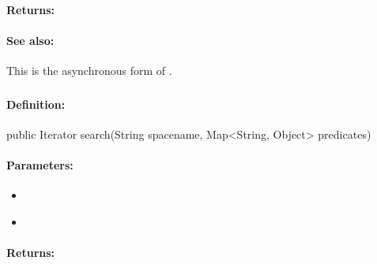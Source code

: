 \paragraph{Returns:}


\paragraph{See also:}  This is the asynchronous form of .

\pagebreak
\subsubsection{}
\label{api:java:search}


\paragraph{Definition:}
\begin{javacode}
public Iterator search(String spacename, Map<String, Object> predicates)
\end{javacode}

\paragraph{Parameters:}
\begin{itemize}[noitemsep]
\item {}\\

\item {}\\

\end{itemize}

\paragraph{Returns:}


\pagebreak
\subsubsection{}
\label{api:java:search_describe}



